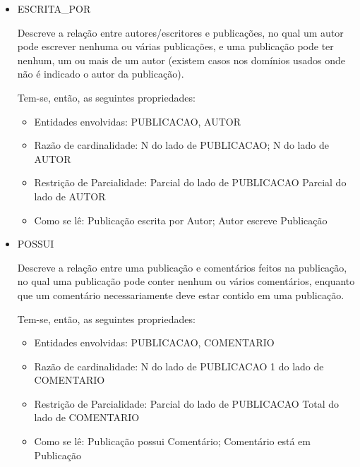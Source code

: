 \documentclass{article}
\begin{document}
\begin{itemize}

				\item ESCRITA\_POR

Descreve a relação entre autores/escritores e publicações, no qual um autor pode escrever nenhuma ou várias publicações, e uma publicação pode ter nenhum, um ou mais de um autor (existem casos nos domínios usados onde não é indicado o autor da publicação).

Tem-se, então, as seguintes propriedades:

\begin{itemize}

				\item Entidades envolvidas: PUBLICACAO, AUTOR
				\item Razão de cardinalidade:     N do lado de PUBLICACAO;  N do lado de AUTOR
				\item Restrição de Parcialidade: Parcial do lado de PUBLICACAO                        Parcial do lado de AUTOR
				\item Como se lê: Publicação escrita por Autor; Autor escreve Publicação
\end{itemize}
\end{itemize}

\begin{itemize}
				\item POSSUI

Descreve a relação entre uma publicação e comentários feitos na publicação, no qual uma publicação pode conter nenhum ou vários comentários, enquanto que um comentário necessariamente deve estar contido em uma publicação.

Tem-se, então, as seguintes propriedades:
\begin{itemize}
				\item Entidades envolvidas: PUBLICACAO, COMENTARIO
				\item Razão de cardinalidade:     N do lado de PUBLICACAO
                1 do lado de COMENTARIO
				\item Restrição de Parcialidade: Parcial do lado de PUBLICACAO                        Total do lado de COMENTARIO
				\item Como se lê: Publicação possui Comentário; Comentário está em Publicação
\end{itemize}
\end{itemize}
\end{document}
